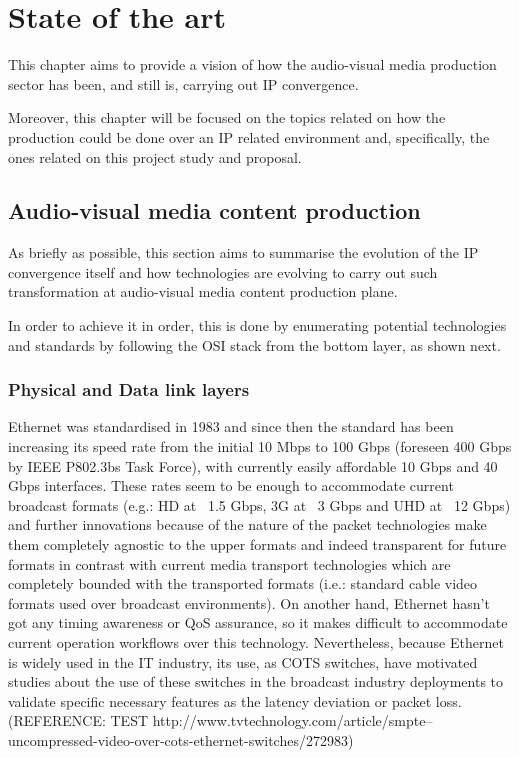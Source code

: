 \chapter{State of the art}\label{A:stateOfTheArt}

This chapter aims to provide a vision of how the audio-visual media production sector has been, and still is, carrying out IP convergence. 

Moreover, this chapter will be focused on the topics related on how the production could be done over an IP related environment and, specifically, the ones related on this project study and proposal.

\section{Audio-visual media content production}

As briefly as possible, this section aims to summarise the evolution of the IP convergence itself and how technologies are evolving to carry out such transformation at audio-visual media content production plane.

In order to achieve it in order, this is done by enumerating potential technologies and standards by following the OSI stack from the bottom layer, as shown next.

\subsection{Physical and Data link layers}

Ethernet was standardised in 1983 and since then the standard has been increasing its speed rate from the initial 10 Mbps to 100 Gbps (foreseen 400 Gbps by IEEE P802.3bs Task Force), with currently easily affordable 10 Gbps and 40 Gbps interfaces. These rates seem to be enough to accommodate current broadcast formats (e.g.: HD at ~1.5 Gbps, 3G at ~3 Gbps and UHD at ~12 Gbps) and further innovations because of the nature of the packet technologies make them completely agnostic to the upper formats and indeed transparent for future formats in contrast with current media transport technologies which are completely bounded with the transported formats (i.e.: standard cable video formats used over broadcast environments). On another hand, Ethernet hasn't got any timing awareness or QoS assurance, so it makes difficult to accommodate current operation workflows over this technology. Nevertheless, because Ethernet is widely used in the IT industry, its use, as COTS switches, have motivated studies about the use of these switches in the broadcast industry deployments to validate specific necessary features as the latency deviation or packet loss. (REFERENCE: TEST http://www.tvtechnology.com/article/smpte--uncompressed-video-over-cots-ethernet-switches/272983)

